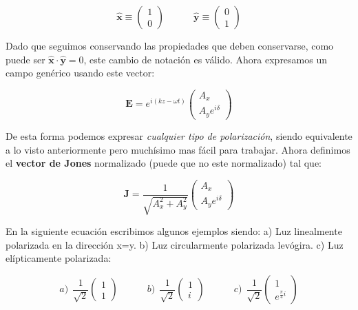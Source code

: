 \documentclass[12pt]{article}
\newcommand{\tquad}{\quad \quad \quad}
\newcommand{\En}{\mathbf{E}}
\newcommand{\Jn}{\mathbf{J}}
\newcommand{\hnx}{\hat{\mathbf{x}}}
\newcommand{\hny}{\hat{\mathbf{y}}}
\numberwithin{equation}{section}
\numberwithin{figure}{section}
\begin{document}
\begin{equation}
\hnx \equiv \begin{pmatrix}
1 \\
0
\end{pmatrix} \tquad
\hny \equiv \begin{pmatrix}
0 \\
1
\end{pmatrix}
\end{equation}

Dado que seguimos conservando las propiedades que deben conservarse, como puede ser $\hnx \cdot \hny = 0$, este cambio de notación es válido. Ahora expresamos un campo genérico usando este vector:

\begin{equation}
\En = e^{i(kz-\omega t)} \begin{pmatrix}
A_x \\
A_y e^{i \delta}
\end{pmatrix}
\end{equation}

De esta forma podemos expresar \textit{cualquier tipo de polarización}, siendo equivalente a lo visto anteriormente pero muchísimo mas fácil para trabajar. Ahora definimos el \textbf{vector de Jones} normalizado (puede que no este normalizado) tal que:

\begin{equation}
\Jn = \dfrac{1}{\sqrt{A_x^2 + A_y^2}} \begin{pmatrix}
A_x \\
A_y e^{i \delta}
\end{pmatrix}
\end{equation}

En la siguiente ecuación escribimos algunos ejemplos siendo: a) Luz linealmente polarizada en la dirección x=y. b) Luz circularmente polarizada levógira. c) Luz elípticamente polarizada:

\begin{equation}
a) \ \  \frac{1}{\sqrt{2}}
\begin{pmatrix}
1 \\
1 
\end{pmatrix} \tquad b) \ \  \frac{1}{\sqrt{2}} 
\begin{pmatrix}
1 \\
i
\end{pmatrix} \tquad c) \ \ \frac{1}{\sqrt{2}}  
\begin{pmatrix}
1 \\
e^{\frac{\pi}{4} i}
\end{pmatrix}
\end{equation}
\end{document}
